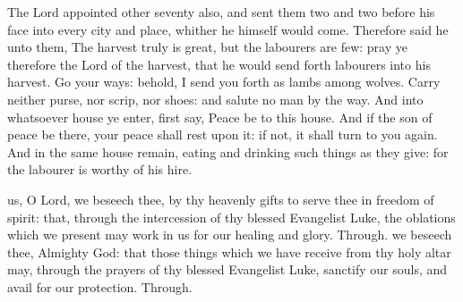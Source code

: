
 The Lord appointed other seventy also, and sent them two and two before his face into every city and place, whither he himself would come. Therefore said he unto them, The harvest truly is great, but the labourers are few: pray ye therefore the Lord of the harvest, that he would send forth labourers into his harvest. Go your ways: behold, I send you forth as lambs among wolves. Carry neither purse, nor scrip, nor shoes: and salute no man by the way. And into whatsoever house ye enter, first say, Peace be to this house. And if the son of peace be there, your peace shall rest upon it: if not, it shall turn to you again. And in the same house remain, eating and drinking such things as they give: for the labourer is worthy of his hire.

\secret
{} us, O Lord, we beseech thee, by thy heavenly gifts to serve thee in freedom of spirit: that, through the intercession of thy blessed Evangelist Luke, the oblations which we present may work in us for our healing and glory. Through.
\postcommunion
{} we beseech thee, Almighty God: that those things which we have receive from thy holy altar may, through the prayers of thy blessed Evangelist Luke, sanctify our souls, and avail for our protection. Through.


